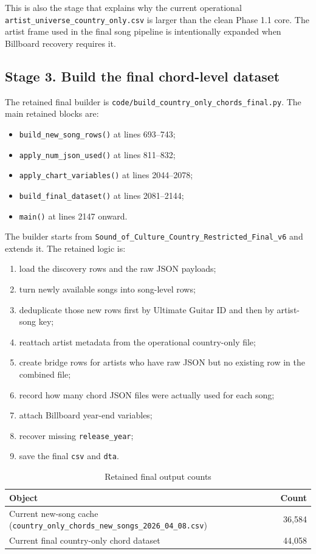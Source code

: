 \documentclass[11pt]{article}
\begin{document}
This is also the stage that explains why the current operational
\texttt{artist\_universe\_country\_only.csv} is larger than the clean Phase 1.1
core. The artist frame used in the final song pipeline is intentionally
expanded when Billboard recovery requires it.

\subsection{Stage 3. Build the final chord-level dataset}
The retained final builder is
\texttt{code/build\_country\_only\_chords\_final.py}. The main retained blocks
are:
\begin{itemize}[leftmargin=2em]
\item \texttt{build\_new\_song\_rows()} at lines 693--743;
\item \texttt{apply\_num\_json\_used()} at lines 811--832;
\item \texttt{apply\_chart\_variables()} at lines 2044--2078;
\item \texttt{build\_final\_dataset()} at lines 2081--2144;
\item \texttt{main()} at lines 2147 onward.
\end{itemize}

The builder starts from \texttt{Sound\_of\_Culture\_Country\_Restricted\_Final\_v6}
and extends it. The retained logic is:
\begin{enumerate}[leftmargin=2em]
\item load the discovery rows and the raw JSON payloads;
\item turn newly available songs into song-level rows;
\item deduplicate those new rows first by Ultimate Guitar ID and then by
artist-song key;
\item reattach artist metadata from the operational country-only file;
\item create bridge rows for artists who have raw JSON but no existing row in
the combined file;
\item record how many chord JSON files were actually used for each song;
\item attach Billboard year-end variables;
\item recover missing \texttt{release\_year};
\item save the final \texttt{csv} and \texttt{dta}.
\end{enumerate}

\begin{table}[H]
\centering
\caption{Retained final output counts}
\begin{tabularx}{\textwidth}{Y r}
\toprule
Object & Count \\
\midrule
Current new-song cache (\texttt{country\_only\_chords\_new\_songs\_2026\_04\_08.csv}) & 36,584 \\
Current final country-only chord dataset & 44,058 \\
\bottomrule
\end{tabularx}
\end{table}
\end{document}
